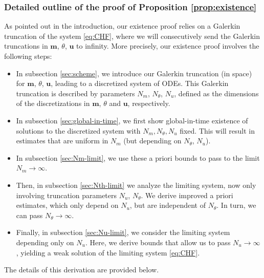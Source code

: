 \documentclass[10pt,letterpaper,twoside]{amsart}
\theoremstyle{definition}{\newtheorem{definition}[lemma]{Definition}}
\theoremstyle{note}{\newtheorem{claim}{Claim}[section]
\newtheorem*{claim*}{Claim}}
\numberwithin{equation}{section}
\newcommand{\bu}{\mathbf{u}}
\newcommand{\bm}{\mathbf{m}}
\begin{document}
\subsubsection{Detailed outline of the proof of Proposition \ref{prop:existence}}
As pointed out in the introduction, our existence proof relies on a Galerkin truncation of the system \eqref{eq:CHF}, where we will consecutively send the Galerkin truncations in $\bm$, $\theta$, $\bu$ to infinity. More precisely, our existence proof involves the following steps:
\begin{itemize}
\item In subsection \ref{sec:scheme}, we introduce our Galerkin truncation  (in space) for $\bm$, $\theta$, $\bu$, leading to a discretized system of ODEs. This Galerkin truncation is described by parameters $N_m$, $N_\theta$, $N_u$, defined as the dimensions of the discretizations in $\bm$, $\theta$ and $\bu$, respectively.
\item In subsection \ref{sec:global-in-time}, we first show global-in-time existence of solutions to the discretized system with $N_m, N_\theta, N_u$ fixed. This will result in estimates that are uniform in $N_m$ (but depending on $N_\theta$, $N_u$). 
\item In subsection \ref{sec:Nm-limit}, we use these a priori bounds to pass to the limit $N_m \to \infty$.
\item Then, in subsection \ref{sec:Nth-limit} we analyze the limiting system, now only involving truncation parameters $N_u$, $N_\theta$. We derive improved a priori estimates, which only depend on $N_u$, but are independent of $N_\theta$. In turn, we can pass $N_\theta\to \infty$.
\item Finally, in subsection \ref{sec:Nu-limit}, we consider the limiting system depending only on $N_u$. Here, we derive bounds that allow us to pass $N_u \to \infty$, yielding a weak solution of the limiting system \eqref{eq:CHF}.
\end{itemize}
The details of this derivation are provided below.
\end{document}
